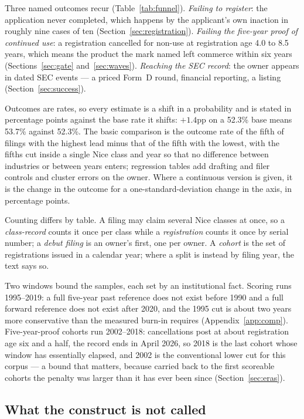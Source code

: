 Three named outcomes recur (Table~\ref{tab:funnel}). \emph{Failing to
register}: the application never completed, which happens by the
applicant's own inaction in roughly nine cases of ten
(Section~\ref{sec:registration}). \emph{Failing the five-year proof of
continued use}: a registration cancelled for non-use at registration age
4.0 to 8.5 years, which means the product the mark named left commerce
within six years (Sections~\ref{sec:gate} and~\ref{sec:waves}).
\emph{Reaching the SEC record}: the owner appears in dated SEC events ---
a priced Form~D round, financial reporting, a listing
(Section~\ref{sec:success}).

Outcomes are rates, so every estimate is a shift in a probability and is
stated in percentage points against the base rate it shifts: $+1.4$pp on
a 52.3\% base means 53.7\% against 52.3\%. The basic comparison is the
outcome rate of the fifth of filings with the highest lead minus that of
the fifth with the lowest, with the fifths cut inside a single Nice class
and year so that no difference between industries or between years
enters; regression tables add drafting and filer controls and cluster
errors on the owner. Where a continuous version is given, it is the
change in the outcome for a one-standard-deviation change in the axis, in
percentage points.

Counting differs by table. A filing may claim several Nice classes at
once, so a \emph{class-record} counts it once per class while a
\emph{registration} counts it once by serial number; a \emph{debut
filing} is an owner's first, one per owner. A \emph{cohort} is the set of
registrations issued in a calendar year; where a split is instead by
filing year, the text says so.

Two windows bound the samples, each set by an institutional fact. Scoring
runs 1995--2019: a full five-year past reference does not exist before
1990 and a full forward reference does not exist after 2020, and the 1995
cut is about two years more conservative than the measured burn-in
requires (Appendix~\ref{app:comp}). Five-year-proof cohorts run
2002--2018: cancellations post at about registration age six and a half,
the record ends in April 2026, so 2018 is the last cohort whose window
has essentially elapsed, and 2002 is the conventional lower cut for this
corpus --- a bound that matters, because carried back to the first
scoreable cohorts the penalty was larger than it has ever been since
(Section~\ref{sec:eras}).

\subsection{What the construct is not called}\label{sec:neighbours}


